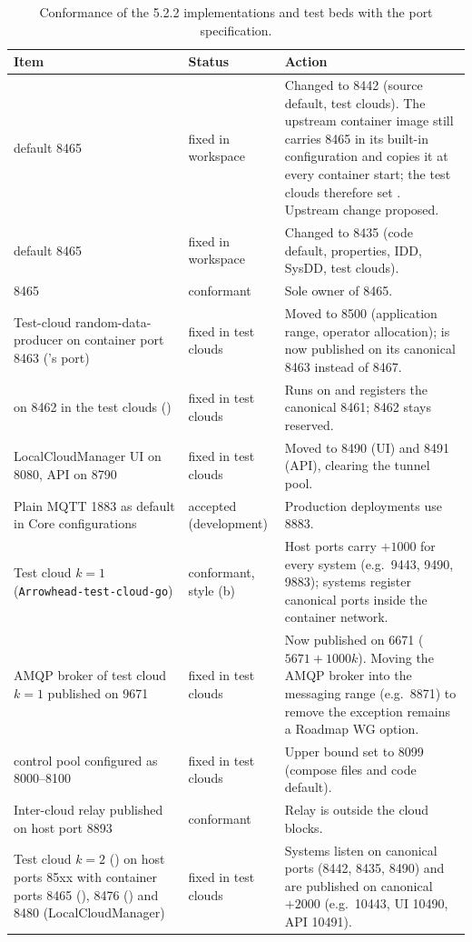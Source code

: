 \begin{table}[h!]
\centering\footnotesize
\begin{tabularx}{\textwidth}{|P{4.3cm}|P{3.3cm}|Y|}\hline
{}Item & Status & Action \\\hline
{} default 8465 & fixed in workspace & Changed to 8442 (source default, test clouds). The upstream container image still carries 8465 in its built-in configuration and copies it at every container start; the test clouds therefore set . Upstream change proposed. \\\hline
{} default 8465 & fixed in workspace & Changed to 8435 (code default, properties, IDD, SysDD, test clouds). \\\hline
{} 8465 & conformant & Sole owner of 8465. \\\hline
Test-cloud random-data-producer on container port 8463 ('s port) & fixed in test clouds & Moved to 8500 (application range, operator allocation);  is now published on its canonical 8463 instead of 8467. \\\hline
{} on 8462 in the test clouds () & fixed in test clouds & Runs on and registers the canonical 8461; 8462 stays reserved. \\\hline
LocalCloudManager UI on 8080, API on 8790 & fixed in test clouds & Moved to 8490 (UI) and 8491 (API), clearing the tunnel pool. \\\hline
Plain MQTT 1883 as  default in Core configurations & accepted (development) & Production deployments use 8883. \\\hline
Test cloud $k=1$ (\texttt{Arrowhead-test-cloud-go}) & conformant, style (b) & Host ports carry $+1000$ for every system (e.g.\ 9443, 9490, 9883); systems register canonical ports inside the container network. \\\hline
AMQP broker of test cloud $k=1$ published on 9671 & fixed in test clouds & Now published on 6671 ($5671+1000k$). Moving the AMQP broker into the messaging range (e.g.\ 8871) to remove the exception remains a Roadmap WG option. \\\hline
{} control pool configured as 8000--8100 & fixed in test clouds & Upper bound set to 8099 (compose files and code default). \\\hline
Inter-cloud relay published on host port 8893 & conformant & Relay is outside the cloud blocks. \\\hline
Test cloud $k=2$ () on host ports 85xx with container ports 8465 (), 8476 () and 8480 (LocalCloudManager) & fixed in test clouds & Systems listen on canonical ports (8442, 8435, 8490) and are published on canonical $+2000$ (e.g.\ 10443, UI 10490, API 10491). \\\hline
\end{tabularx}
\caption{Conformance of the 5.2.2 implementations and test beds with the port specification.}
\label{tab:portconf}
\end{table}
